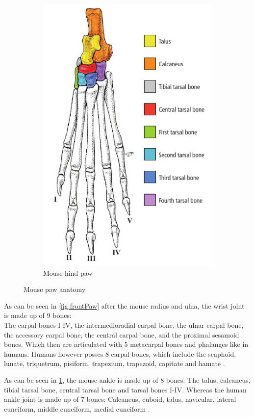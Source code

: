 \begin{figure}[h]
\begin{subfigure}{0.49\textwidth}
		\includegraphics[scale=0.5]{images/mouseHindPaw.png}
		\caption{Mouse hind paw \cite{ruberteMorphologicalMousePhenotyping2017}}\label{fig:hindPaw}
	\end{subfigure}
	\caption{Mouse paw anatomy}\label{fig:mousePaws}
\end{figure}

\noindent
As can be seen in \cref{fig:frontPaw} after the mouse radius and ulna, the wrist joint is made up of 9 bones:\\
The carpal bones I-IV, the intermedioradial carpal bone, the ulnar carpal bone, the accessory carpal bone,
the central carpal bone, and the proximal sesamoid bones.
Which then are articulated with 5 metacarpal bones and phalanges like in humans.
Humans however posses 8 carpal bones, which include the scaphoid, lunate, triquetrum, pisiform,
trapezium, trapezoid, capitate and hamate \cite{platzerTaschenatlasAnatomieBd2013}.

\noindent
As can be seen in \cref{fig:hindPaw}, the mouse ankle is made up of 8 bones:
The talus, calcaneus, tibial tarsal bone, central tarsal bone and tarsal bones I-IV.
Whereas the human ankle joint is made up of 7 bones:
Calcaneus, cuboid, talus, navicular, lateral cuneiform, middle cuneiform, medial cuneiform \cite{platzerTaschenatlasAnatomieBd2013}.

